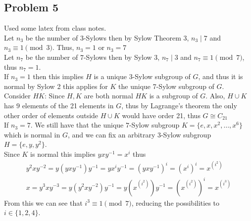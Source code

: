 \documentclass[12pt, letterpaper]{article}
\theoremstyle{definition}
\begin{document}
\subsection*{Problem 5}
Used some latex from class notes.\\
Let $n_3$ be the number of $3$-Sylows then by Sylow Theorem 3, $n_3 \mid 7$ and $n_3 \equiv 1 \pmod{3}$.
Thus, $n_3 = 1$ or $n_3 = 7$\\
Let $n_7$ be the number of $7$-Sylows then by Sylow 3, $n_7 \mid 3$ and $n_7 \equiv 1 \pmod{7}$, thus $n_7 = 1$.\\
If $n_3 = 1$ then this implies $H$ is a unique 3-Sylow subgroup of $G$, and thus it is normal by Sylow 2 this applies 
for $K$ the unique 7-Sylow subgroup of $G$.\\
Consider $HK$: Since $H,K$ are both normal $HK$ is a subgroup of $G$. Also, $H\cup K$ has $9$ elements of the 21 elements in $G$,
thus by Lagrange's theorem the only other order of elements outside $H \cup K$ would have order 21, thus $G \cong C_{21}$\\
If $n_3 = 7$. We still have that the unique $7$-Sylow subgroup $K=\{e,x,x^2,\dots,x^6\}$ which is normal in $G$, and we can fix an arbitrary $3$-Sylow subgroup $H = \{e, y, y^2 \}$.\\
Since  $K$ is normal this implies $yxy^{-1}=x^i$ thus
\begin{gather*}
    y^2 x y^{-2} = y(yxy^{-1})y^{-1} = y x^i y^{-1} = (yxy^{-1})^i = (x^i)^i = x^{(i^2)} \\
    x = y^3 x y^{-3} = y (y^2 x y^{-2})y^{-1} = y(x^{(i^2)})y^{-1} = (x^{(i^2)})^i = x^{(i^3)}
\end{gather*}
From this we can see that $i^3 \equiv 1 \pmod{7}$, reducing the possibilities to $i \in \{1, 2, 4 \}$.
\end{document}
